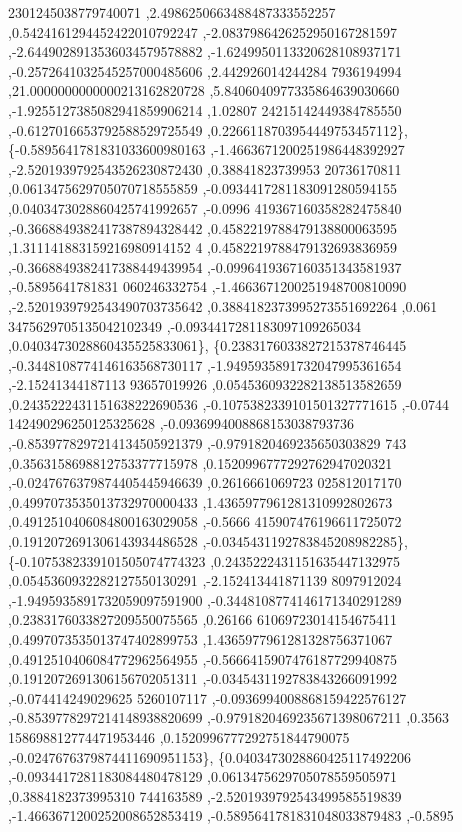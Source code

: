 \begin{DoxyCode}
      2301245038779740071 ,2.4986250663488487333552257 ,0.5424161294452422010792247 ,-2.0837986426252950167281597 
      ,-2.6449028913536034579578882 ,-1.6249950113320628108937171 ,-0.2572641032545257000485606 ,2.442926014244284
      7936194994 ,21.0000000000000213162820728 ,5.8406040977335864639030660 ,-1.9255127385082941859906214 ,1.02807
      24215142449384785550 ,-0.6127016653792588529725549 ,0.2266118703954449753457112\},
\{-0.5895641781831033600980163 ,-1.4663671200251986448392927 ,-2.5201939792543526230872430 ,0.38841823739953
      20736170811 ,0.0613475629705070718555859 ,-0.0934417281183091280594155 ,0.0403473028860425741992657 ,-0.0996
      419367160358282475840 ,-0.3668849382417387894328442 ,0.4582219788479138800063595 ,1.311141883159216980914152
      4 ,0.4582219788479132693836959 ,-0.3668849382417388449439954 ,-0.0996419367160351343581937 ,-0.5895641781831
      060246332754 ,-1.4663671200251948700810090 ,-2.5201939792543490703735642 ,0.3884182373995273551692264 ,0.061
      3475629705135042102349 ,-0.0934417281183097109265034 ,0.0403473028860435525833061\},
\{0.2383176033827215378746445 ,-0.3448108774146163568730117 ,-1.9495935891732047995361654 ,-2.15241344187113
      93657019926 ,0.0545360932282138513582659 ,0.2435222431151638222690536 ,-0.1075382339101501327771615 ,-0.0744
      142490296250125325628 ,-0.0936994008868153038793736 ,-0.8539778297214134505921379 ,-0.9791820469235650303829
      743 ,0.3563158698812753377715978 ,0.1520996777292762947020321 ,-0.0247676379874405445946639 ,0.2616661069723
      025812017170 ,0.4997073535013732970000433 ,1.4365977961281310992802673 ,0.4912510406084800163029058 ,-0.5666
      415907476196611725072 ,0.1912072691306143934486528 ,-0.0345431192783845208982285\},
\{-0.1075382339101505074774323 ,0.2435222431151635447132975 ,0.0545360932282127550130291 ,-2.152413441871139
      8097912024 ,-1.9495935891732059097591900 ,-0.3448108774146171340291289 ,0.2383176033827209550075565 ,0.26166
      61069723014154675411 ,0.4997073535013747402899753 ,1.4365977961281328756371067 ,0.4912510406084772962564955 
      ,-0.5666415907476187729940875 ,0.1912072691306156702051311 ,-0.0345431192783843266091992 ,-0.074414249029625
      5260107117 ,-0.0936994008868159422576127 ,-0.8539778297214148938820699 ,-0.9791820469235671398067211 ,0.3563
      158698812774471953446 ,0.1520996777292751844790075 ,-0.0247676379874411690951153\},
\{0.0403473028860425117492206 ,-0.0934417281183084480478129 ,0.0613475629705078559505971 ,0.3884182373995310
      744163589 ,-2.5201939792543499585519839 ,-1.4663671200252008652853419 ,-0.5895641781831048033879483 ,-0.5895

\end{DoxyCode}
